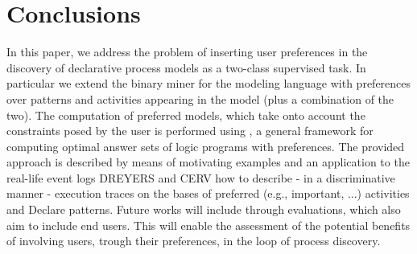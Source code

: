

\section{Conclusions}
\label{sec:conclusions}

In this paper, we address the problem of inserting user preferences in the discovery of declarative process models as a two-class supervised task. In particular we extend the \nd binary miner for the \declare modeling language with preferences over \declare patterns and activities appearing in the model (plus a combination of the two). 
The computation of preferred models, which take onto account the constraints posed by the user is performed using \asprin, a general framework for computing optimal answer sets of logic programs with preferences. The provided approach is described by means of motivating examples and an application to the real-life event logs DREYERS and CERV how to describe - in a discriminative manner - execution traces on the bases of preferred (e.g., important, ...) activities and Declare patterns. Future works will include through evaluations, which also aim to include end users. This will enable the assessment of the potential benefits of involving users, trough their preferences, in the loop of process discovery.

